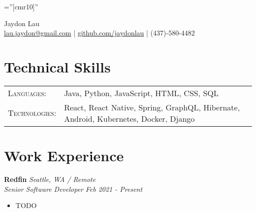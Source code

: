 \documentclass[a4paper,11pt]{article}
\begin{document}
\pagestyle{empty} %

\font\fb=''[cmr10]'' %

\par{\centering
		{\Huge Jaydon Lau
	}\\ \vspace{1.4mm} 
	\faEnvelopeO \hspace{0.4mm} \href{mailto:lau.jaydon@gmail.com}{lau.jaydon@gmail.com} \hspace{0.4mm} | \hspace{0.4mm} \faGithub \hspace{0.4mm} \href{https://github.com/jaydonlau}{github.com/jaydonlau}  \hspace{0.4mm} | \hspace{0.4mm} \faPhone \hspace{0.4mm} (437)-580-4482
	\par}


\section{Technical Skills}
\vspace{5pt}
\begin{tabular}{@{}ll}
\textsc{Languages:} & Java, Python, JavaScript, HTML, CSS, SQL \\
\textsc{Technologies: } & React, React Native, Spring, GraphQL, Hibernate, Android, Kubernetes, Docker, Django \\
\end{tabular}

\section{Work Experience}
\vspace{5pt}
\textbf{Redfin} \hspace*{\fill}\emph{Seattle, WA / Remote} \\
\emph{Senior Software Developer} \hspace*{\fill} \emph{Feb 2021 - Present}
	\begin{itemize}[noitemsep, topsep=-1ex]
	\item TODO
	\end{itemize}
\end{document}
